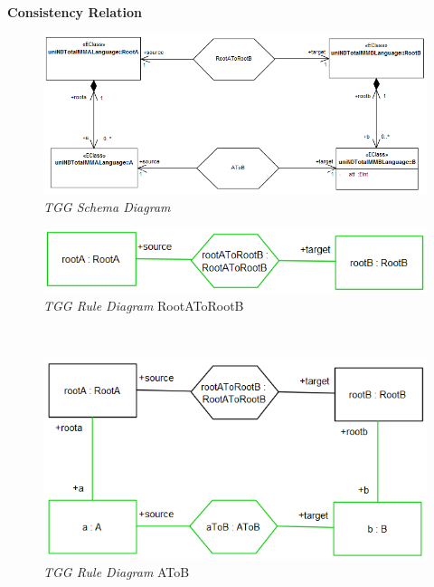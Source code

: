 \documentclass{article}
\begin{document}
~\\
\textbf{Consistency Relation}

\begin{figure}[ht]
  \centering 
  \includegraphics[scale=0.4]{printscreens/ea-MMAToMMBatt.png}
  \caption{\textit{TGG Schema Diagram}}
  \label{fig:bij-schema}
\end{figure}

\pagebreak

\begin{figure}[ht]
  \centering 
  \includegraphics[scale=0.5]{printscreens/ea-RootAToRootB-rule.png}
  \caption{\textit{TGG Rule Diagram} RootAToRootB}
  \label{fig:ea-RootAToRootB-rule}
\end{figure}

~\\

\begin{figure}[ht]
  \centering 
  \includegraphics[scale=0.5]{printscreens/ea-AToB-rule.png}
  \caption{\textit{TGG Rule Diagram} AToB}
  \label{fig:ea-AToB-rule}
\end{figure}
\end{document}
